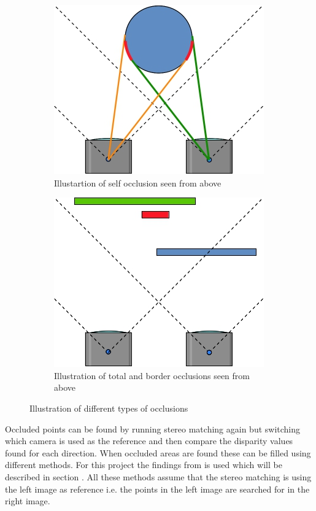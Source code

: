 \begin{figure}[ht!]
  \centering
  \begin{subfigure}[t]{0.45\textwidth}
    \centering\includegraphics[scale=0.4]{figures/occlself.jpg}
    \caption{Illustartion of self occlusion seen from above\label{fig:occlself}}
  \end{subfigure}\hspace{0.5cm}
  \begin{subfigure}[t]{0.45\textwidth}
    \centering\includegraphics[scale=0.4]{figures/occltotalborder}
    \caption{Illustration of total and border occlusions seen from above\label{fig:occltb}}
  \end{subfigure}
  \caption{Illustration of different types of occlusions\label{fig:occltypes}}
\end{figure}

Occluded points can be found by running stereo matching again but switching which camera is used as the reference and then compare the disparity values found for each direction. When occluded areas are found these can be filled using different methods. For this project the findings from \cite{huq2013occlusion} is used which will be described in section . All these methods assume that the stereo matching is using the left image as reference i.e. the points in the left image are searched for in the right image. 

